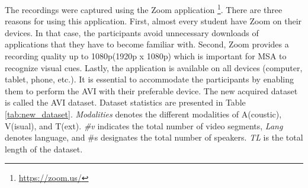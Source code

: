The recordings were captured using the Zoom application \footnote{\url{https://zoom.us/}}. There are three reasons for using this application. First, almost every student have Zoom on their devices. In that case, the participants avoid unnecessary downloads of applications that they have to become familiar with. Second, Zoom provides a recording quality up to 1080p(1920p x 1080p) which is important for MSA to recognize visual cues. Lastly, the application is available on all devices (computer, tablet, phone, etc.). It is essential to accommodate the participants by enabling them to perform the AVI with their preferable device. The new acquired dataset is called the AVI dataset. Dataset statistics are presented in Table \ref{tab:new_dataset}. \textit{Modalities} denotes the different modalities of A(coustic), V(isual), and T(ext). \textit{\#v} indicates the total number of video segments, \textit{Lang} denotes language, and \#s designates the total number of speakers. \textit{TL} is the total length of the dataset.  
%
\begin{table}[h]
\caption{AVI dataset statistics.}
\centering
{}
\label{tab:new_dataset}
\end{table}

